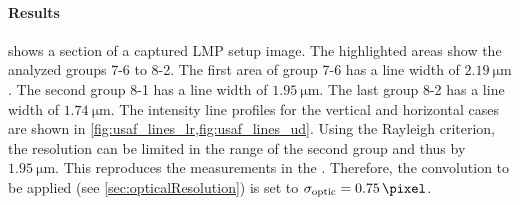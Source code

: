 \paragraph{Results}
 shows a section of a captured \ac{LMP} setup image.
The highlighted areas show the analyzed groups 7-6 to 8-2.
The first area of group 7-6  has a line width of $\SI{2.19}{\micro\meter}$.
The second group 8-1  has a line width of $\SI{1.95}{\micro\meter}$.
The last group 8-2  has a line width of $\SI{1.74}{\micro\meter}$.
The intensity line profiles for the vertical and horizontal cases are shown in \cref{fig:usaf_lines_lr,fig:usaf_lines_ud}.
%
Using the Rayleigh criterion, the resolution can be limited in the range of the second group and thus by $\SI{1.95}{\micro\meter}$.
This reproduces the measurements in the \cite{MenzelMaster}.
Therefore, the convolution to be applied (see \cref{sec:opticalResolution}) is set to $\opticsigma = \SI{0.75}{\pixel}$.
%
%
%
